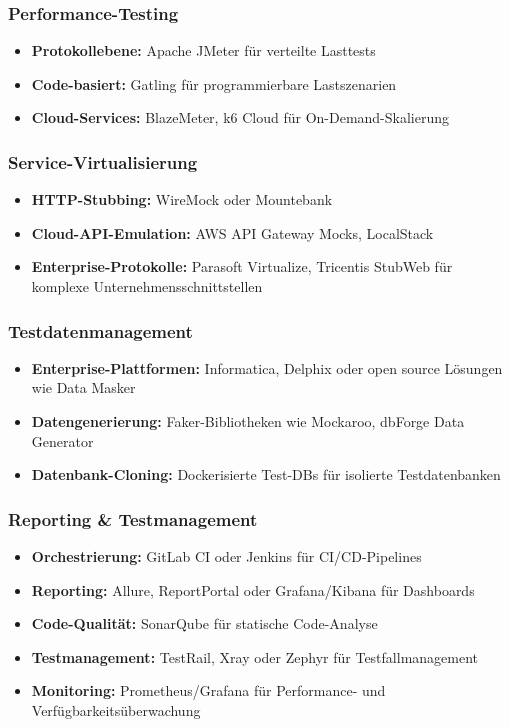 \subsubsection{Performance-Testing}
\begin{itemize}
    \item \textbf{Protokollebene:} Apache JMeter für verteilte Lasttests
    \item \textbf{Code-basiert:} Gatling für programmierbare Lastszenarien
    \item \textbf{Cloud-Services:} BlazeMeter, k6 Cloud für On-Demand-Skalierung
\end{itemize}

\subsubsection{Service-Virtualisierung}
\begin{itemize}
    \item \textbf{HTTP-Stubbing:} WireMock oder Mountebank
    \item \textbf{Cloud-API-Emulation:} AWS API Gateway Mocks, LocalStack
    \item \textbf{Enterprise-Protokolle:} Parasoft Virtualize, Tricentis StubWeb für komplexe
    Unternehmensschnittstellen
\end{itemize}

\subsubsection{Testdatenmanagement}
\begin{itemize}
    \item \textbf{Enterprise-Plattformen:} Informatica, Delphix oder open source Lösungen wie
    Data Masker
    \item \textbf{Datengenerierung:} Faker-Bibliotheken wie Mockaroo, dbForge Data Generator
    \item \textbf{Datenbank-Cloning:} Dockerisierte Test-DBs für isolierte Testdatenbanken
\end{itemize}

\subsubsection{Reporting \& Testmanagement}
\begin{itemize}
    \item \textbf{Orchestrierung:} GitLab CI oder Jenkins für CI/CD-Pipelines
    \item \textbf{Reporting:} Allure, ReportPortal oder Grafana/Kibana für Dashboards
    \item \textbf{Code-Qualität:} SonarQube für statische Code-Analyse
    \item \textbf{Testmanagement:} TestRail, Xray oder Zephyr für Testfallmanagement
    \item \textbf{Monitoring:} Prometheus/Grafana für Performance- und Verfügbarkeitsüberwachung
\end{itemize}

